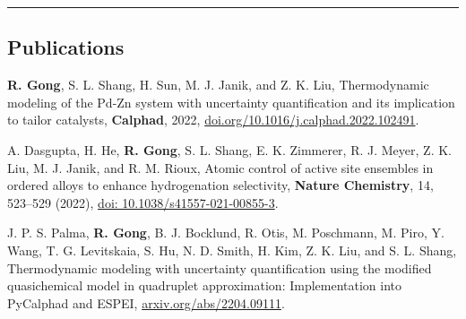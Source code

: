 \documentclass[10pt,letterpaper]{article}
\begin{document}
\hrule
\vspace{-0.6em}
\subsection*{Publications}

\begin{etaremune}
  \item \textbf{R. Gong}, S. L. Shang, H. Sun, M. J. Janik, and Z. K. Liu,
  Thermodynamic modeling of the Pd-Zn system with uncertainty quantification and its implication to tailor catalysts, 
  \textbf{Calphad}, 2022, \href{https://doi.org/10.1016/j.calphad.2022.102491}{doi.org/10.1016/j.calphad.2022.102491}.
  \item  A. Dasgupta, H. He, \textbf{R. Gong}, S. L. Shang, E. K. Zimmerer, R. J. Meyer, Z. K. Liu, M. J. Janik, and R. M. Rioux,
  Atomic control of active site ensembles in ordered alloys to enhance hydrogenation selectivity, 
  \textbf{Nature Chemistry}, 14, 523–529 (2022), \href{https://doi.org/10.1038/s41557-021-00855-3}{doi: 10.1038/s41557-021-00855-3}.
  \item J. P. S. Palma, \textbf{R. Gong}, B. J. Bocklund, R. Otis, M. Poschmann, M. Piro, Y. Wang, T. G. Levitskaia, S. Hu,  N. D. Smith, H. Kim, Z. K. Liu, and S. L. Shang, 
  Thermodynamic modeling with uncertainty quantification using the modified quasichemical model in quadruplet approximation: Implementation into PyCalphad and ESPEI,  \href{http://arxiv.org/abs/2204.09111}{arxiv.org/abs/2204.09111}.
\end{etaremune}
\end{document}
